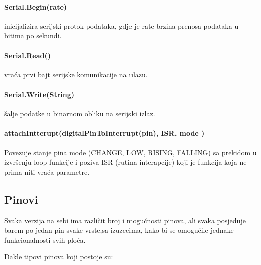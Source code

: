 \documentclass[../Document.tex]{subfiles}
\begin{document}
\paragraph{Serial.Begin(rate)} inicijalizira serijski protok podataka, gdje je rate brzina prenosa podataka u bitima po sekundi.

\paragraph{Serial.Read()} vraća prvi bajt serijske komunikacije na ulazu.

\paragraph{Serial.Write(String)} šalje podatke u binarnom obliku na serijski izlaz.

\paragraph{attachIntterupt(digitalPinToInterrupt(pin), ISR, mode )} Povezuje stanje pina mode (CHANGE, LOW, RISING, FALLING) sa prekidom u izvršenju loop funkcije i poziva ISR (rutina interapcije) koji je funkcija koja ne prima niti vraća parametre.


\subsection{Pinovi}

Svaka verzija na sebi ima različit broj i mogućnosti pinova, ali svaka posjeduje barem po jedan pin svake vrste,sa izuzecima, kako bi se omogućile jednake funkcionalnosti svih ploča.

\noindent Dakle tipovi pinova koji postoje su:
\end{document}

